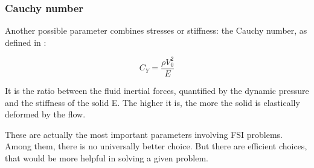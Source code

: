 \subsubsection{Cauchy number}

Another possible parameter combines stresses or stiffness: the  Cauchy number, as defined in \cite{de2001fluides}:

\begin{equation}
	C_Y = \frac{\rho V_0^2}{E}
\end{equation}

It is the ratio between the fluid inertial forces, quantified by the dynamic pressure and the stiffness of the solid E. 
The higher it is, the more the solid is elastically deformed by the flow.


These are actually the most important parameters involving FSI problems. Among them, there is no universally better choice. But there are efficient choices, that would be more helpful
in solving a given problem. 


